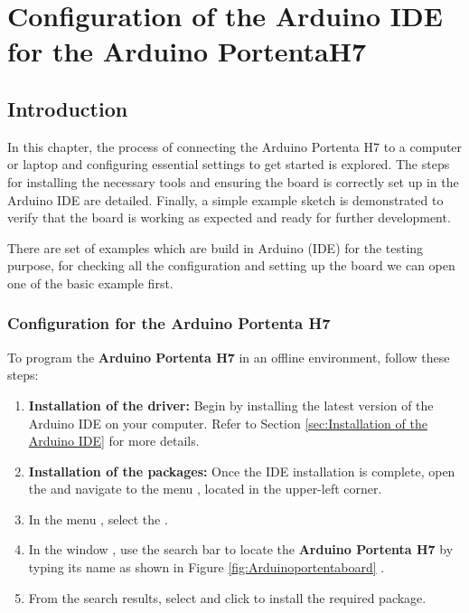 %
%
%



\chapter{Configuration of the Arduino IDE for the Arduino PortentaH7}

\section{Introduction}

In this chapter, the process of connecting the Arduino Portenta H7 to a computer or laptop and configuring essential settings to get started is explored. The steps for installing the necessary tools and ensuring the board is correctly set up in the Arduino IDE are detailed. Finally, a simple example sketch is demonstrated to verify that the board is working as expected and ready for further development.


There are set of examples which are build in Arduino (IDE) for the testing purpose, for checking all the configuration and setting up the board we can open one of the basic example  first.

\subsection{Configuration for the Arduino Portenta H7}

To program the \textbf{Arduino Portenta H7} in an offline environment, follow these steps:


\begin{enumerate}
	\subsection{Installation of the driver}
	\item \textbf{Installation of the driver:} Begin by installing the latest version of the Arduino IDE on your computer. Refer to Section \ref{sec:Installation of the Arduino IDE} for more details.
	\item \textbf{Installation of the packages:} Once the IDE installation is complete, open the  and navigate to the menu  , located in the upper-left corner.
	\item In the menu , select the .
	\item In the window , use the search bar to locate the \textbf{Arduino Portenta H7} by typing its name as shown in Figure \ref{fig:Arduinoportentaboard}		.
	\item From the search results, select  and click  to install the required package.
\end{enumerate}

